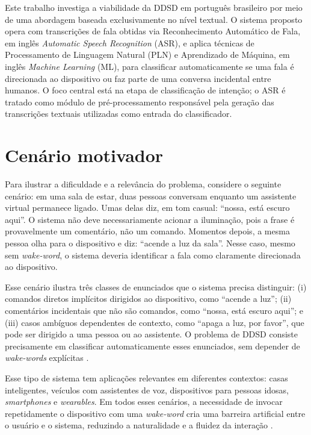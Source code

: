 \documentclass[
    12pt,                %
    openright,           %
    oneside,             %
    a4paper,             %
    english,             %
    brazil               %
]{abntex2}
\begin{document}
Este trabalho investiga a viabilidade da DDSD em português brasileiro por meio de uma abordagem baseada exclusivamente no nível textual. O sistema proposto opera com transcrições de fala obtidas via Reconhecimento Automático de Fala, em inglês \textit{Automatic Speech Recognition} (ASR), e aplica técnicas de Processamento de Linguagem Natural (PLN) e Aprendizado de Máquina, em inglês \textit{Machine Learning} (ML), para classificar automaticamente se uma fala é direcionada ao dispositivo ou faz parte de uma conversa incidental entre humanos. O foco central está na etapa de classificação de intenção; o ASR é tratado como módulo de pré-processamento responsável pela geração das transcrições textuais utilizadas como entrada do classificador.


\section{Cenário motivador}
\label{sec:cenario}

Para ilustrar a dificuldade e a relevância do problema, considere o seguinte cenário: em uma sala de estar, duas pessoas conversam enquanto um assistente virtual permanece ligado. Umas delas diz, em tom casual: ``nossa, está escuro aqui''. O sistema não deve necessariamente acionar a iluminação, pois a frase é provavelmente um comentário, não um comando. Momentos depois, a mesma pessoa olha para o dispositivo e diz: ``acende a luz da sala''. Nesse caso, mesmo sem \textit{wake-word}, o sistema deveria identificar a fala como claramente direcionada ao dispositivo.

Esse cenário ilustra três classes de enunciados que o sistema precisa distinguir: (i) comandos diretos implícitos dirigidos ao dispositivo, como ``acende a luz''; (ii) comentários incidentais que não são comandos, como ``nossa, está escuro aqui''; e (iii) casos ambíguos dependentes de contexto, como ``apaga a luz, por favor'', que pode ser dirigido a uma pessoa ou ao assistente. O problema de DDSD consiste precisamente em classificar automaticamente esses enunciados, sem depender de \textit{wake-words} explícitas \cite{Mallidi2018, Wagner2024}.

Esse tipo de sistema tem aplicações relevantes em diferentes contextos: casas inteligentes, veículos com assistentes de voz, dispositivos para pessoas idosas, \textit{smartphones} e \textit{wearables}. Em todos esses cenários, a necessidade de invocar repetidamente o dispositivo com uma \textit{wake-word} cria uma barreira artificial entre o usuário e o sistema, reduzindo a naturalidade e a fluidez da interação \cite{Nie2021}.
\end{document}
